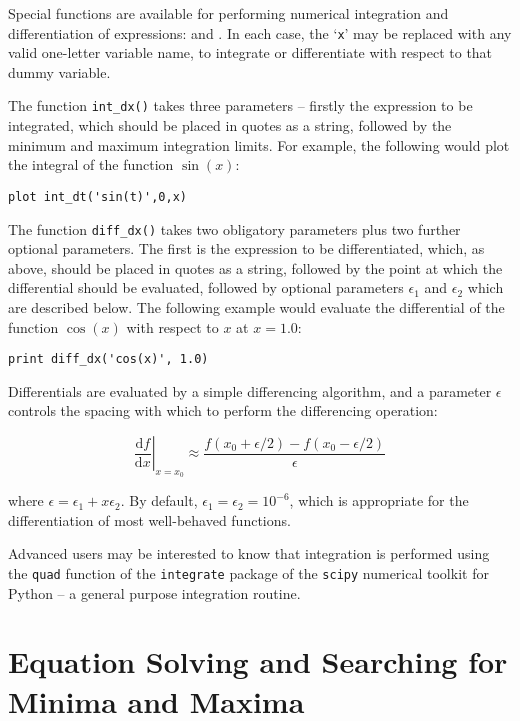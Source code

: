  Special functions are available for
performing numerical integration and differentiation of expressions:
 and . In each case, the `{\tt x}' may
be replaced with any valid one-letter variable name, to integrate or
differentiate with respect to that dummy variable.

The function {\tt int\_dx()} takes three parameters -- firstly the
expression to be integrated, which should be placed in quotes as a string,
followed by the minimum and maximum integration limits. For example, the
following would plot the integral of the function $\sin(x)$:

\begin{verbatim}
plot int_dt('sin(t)',0,x)
\end{verbatim} 

The function {\tt diff\_dx()} takes two obligatory parameters plus two further
optional parameters. The first is the expression to be differentiated, which,
as above, should be placed in quotes as a string, followed by the point at
which the differential should be evaluated, followed by optional parameters
$\epsilon_1$ and $\epsilon_2$ which are described below.  The following example
would evaluate the differential of the function $\cos(x)$ with respect to $x$
at $x=1.0$:

\begin{verbatim}
print diff_dx('cos(x)', 1.0)
\end{verbatim}

Differentials are evaluated by a simple differencing algorithm, and a parameter
$\epsilon$ controls the spacing with which to perform the differencing
operation:

\begin{displaymath}
\left.\frac{\mathrm{d}f}{\mathrm{d}x}\right|_{x=x_0} \approx \frac{f(x_0+\epsilon/2) - f(x_0-\epsilon/2)}{\epsilon}
\end{displaymath}

\noindent where $\epsilon = \epsilon_1 + x \epsilon_2$. By default, $\epsilon_1
= \epsilon_2 = 10^{-6}$, which is appropriate for the differentiation of most
well-behaved functions.

Advanced users may be interested to know that integration is performed using
the {\tt quad} function of the {\tt integrate} package of the
{\tt scipy} numerical toolkit for Python -- a general purpose integration
routine.

\section{Equation Solving and Searching for Minima and Maxima}

